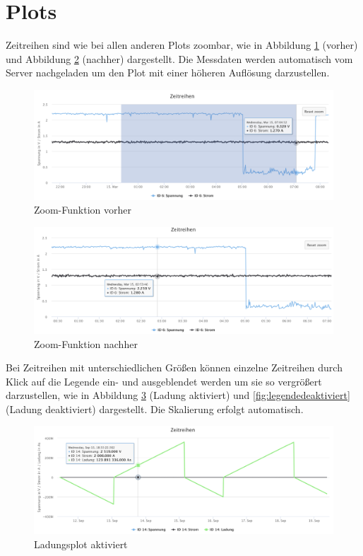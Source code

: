 \section{Plots}

Zeitreihen sind wie bei allen anderen Plots zoombar, wie in Abbildung \ref{fig:zoomvorher} (vorher) und Abbildung \ref{fig:zoomnachher} (nachher) dargestellt. Die Messdaten werden automatisch vom Server nachgeladen um den Plot mit einer höheren Auflösung darzustellen.

\begin{figure}
\centering
\includegraphics[width=\textwidth]{Figures/zoomvorher}
\caption{Zoom-Funktion vorher}
\label{fig:zoomvorher}
\end{figure} 

\begin{figure}
\centering
\includegraphics[width=\textwidth]{Figures/zoomnachher}
\caption{Zoom-Funktion nachher}
\label{fig:zoomnachher}
\end{figure} 

Bei Zeitreihen mit unterschiedlichen Größen können einzelne Zeitreihen durch Klick auf die Legende ein- und ausgeblendet werden um sie so vergrößert darzustellen, wie in Abbildung \ref{fig:legendeaktiviert} (Ladung aktiviert) und \ref{fig:legendedeaktiviert} (Ladung deaktiviert) dargestellt. Die Skalierung erfolgt automatisch.

\begin{figure}
\centering
\includegraphics[width=\textwidth]{Figures/legendeaktiviert}
\caption{Ladungsplot aktiviert}
\label{fig:legendeaktiviert}
\end{figure} 

